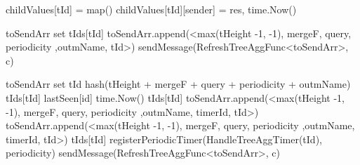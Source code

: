 \begin{algorithm}
\begin{algorithmic}[1]
     \label{alg:mon:tree_agg:recv_propag_vals}
                \State childValues[tId] = map()
            \EndIf
            \State childValues[tId][sender] = res, time.Now()
        \EndIf
    \asdend

     \label{alg:mon:tree_agg:propag}
        \State toSendArr \asdassign set 
            \State <tHeight, mergeF, query, periodicity, outmName, timerId, isLocal, isParentSub, ptId> \asdassign tIds[tId]
                \State toSendArr.append(<max(tHeight -1, -1), mergeF, query, periodicity ,outmName, tId>)
            \EndIf
        \EndFor
            \State sendMessage(RefreshTreeAggFunc<toSendArr>, c)
        \EndFor
    \asdend

     \label{alg:mon:tree_agg:propag_recv}
            \State toSendArr \asdassign set
                \State tId \asdassign hash(tHeight + mergeF + query + periodicity + outmName)
                    \State <tHeight, mergeF, query, periodicity, outmName, timerId, isLocal, isParentSub, ptId> \asdassign tIds[tId]
                    \State lastSeen[id] \asdassign time.Now()
                    \State tIds[tId] \asdassign <tHeight, mergeF, query, periodicity, outmName, timerId, isLocal, true, ptId>
                        \State toSendArr.append(<max(tHeight -1, -1), mergeF, query, periodicity ,outmName, timerId, tId>)
                    \EndIf
                \Else
                    \State toSendArr.append(<max(tHeight -1, -1), mergeF, query, periodicity ,outmName, timerId, tId>)
                    \State tIds[tId] \asdassign <tHeight, mergeF, query, periodicity, outmName, timerId, false, true, ptId>
                    \State registerPeriodicTimer(HandleTreeAggTimer(tId), periodicity)
                \EndIf
            \EndFor
                \State sendMessage(RefreshTreeAggFunc<toSendArr>, c)
            \EndFor
        \EndIf
    \asdend

    \end{algorithmic}
\end{algorithm}
    